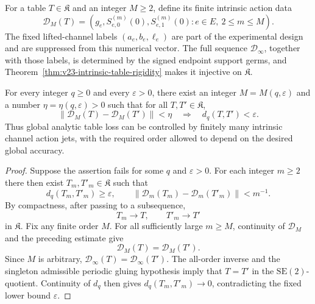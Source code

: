 For a table \(T\in\mathfrak K\) and an integer \(M\ge2\), define its finite
intrinsic action data
\begin{equation}\label{eq:v23-finite-data-map}
 \mathcal D_M(T)
 =\left(
     g_e,
     S_{e,0}^{(m)}(0),S_{e,1}^{(m)}(0):
     e\in E,\ 2\le m\le M
   \right).
\end{equation}
The fixed lifted-channel labels \((a_e,b_e,\ell_e)\) are part of the
experimental design and are suppressed from this numerical vector.  The full
sequence \(\mathcal D_\infty\), together with those labels, is determined by
the signed endpoint support germs, and
Theorem~\ref{thm:v23-intrinsic-table-rigidity} makes it injective on
\(\mathfrak K\).

\begin{theorem}
\label{thm:v23-finite-coordinate-resolution}
For every integer \(q\ge0\) and every \(\varepsilon>0\), there exist an
integer \(M=M(q,\varepsilon)\) and a number
\(\eta=\eta(q,\varepsilon)>0\) such that for all
\(T,T'\in\mathfrak K\),
\begin{equation}\label{eq:v23-finite-resolution}
 \|\mathcal D_M(T)-\mathcal D_M(T')\|<\eta
 \quad\Longrightarrow\quad
 d_q(T,T')<\varepsilon.
\end{equation}
Thus global analytic table loss can be controlled by finitely many intrinsic
channel action jets, with the required order allowed to depend on the desired
global accuracy.
\end{theorem}

\begin{proof}
Suppose the assertion fails for some \(q\) and \(\varepsilon>0\).  For each
integer \(m\ge2\) there then exist \(T_m,T'_m\in\mathfrak K\) such that
\[
 d_q(T_m,T'_m)\ge\varepsilon,
 \qquad
 \|\mathcal D_m(T_m)-\mathcal D_m(T'_m)\|<m^{-1}.
\]
By compactness, after passing to a subsequence,
\[
                         T_m\to T,\qquad T'_m\to T'
\]
in \(\mathfrak K\).  Fix any finite order \(M\).  For all sufficiently large
\(m\ge M\), continuity of \(\mathcal D_M\) and the preceding estimate give
\[
                         \mathcal D_M(T)=\mathcal D_M(T').
\]
Since \(M\) is arbitrary,
\(\mathcal D_\infty(T)=\mathcal D_\infty(T')\).  The all-order inverse and the
singleton admissible periodic gluing hypothesis imply that \(T=T'\) in the
\(\mathrm{SE}(2)\)-quotient.  Continuity of \(d_q\) then gives
\(d_q(T_m,T'_m)\to0\), contradicting the fixed lower bound
\(\varepsilon\).
\end{proof}

